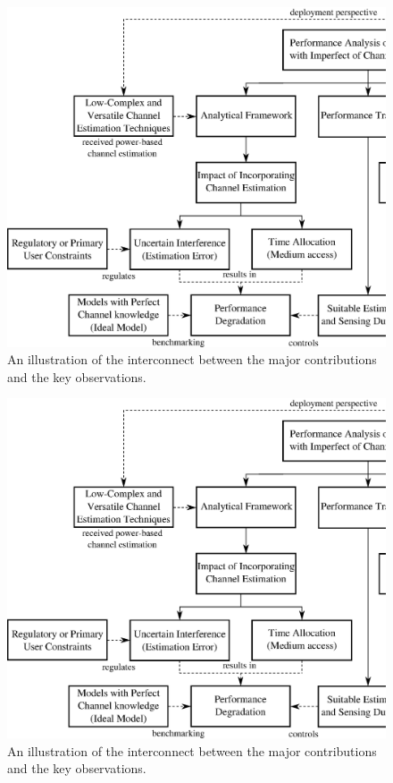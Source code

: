 \ifdebug
\begin{figure}
        \centering
        \includegraphics[width=\textheight]{figures/Contri}
        \caption{An illustration of the interconnect between the major contributions and the key observations.}
        \label{fig_Int:contri}
\end{figure}
\else
\begin{figure}
        \centering
        \includegraphics[width=\textheight]{figures/Contri}
        \caption{An illustration of the interconnect between the major contributions and the key observations.}
        \label{fig_Int:contri}
\end{figure}
\fi

